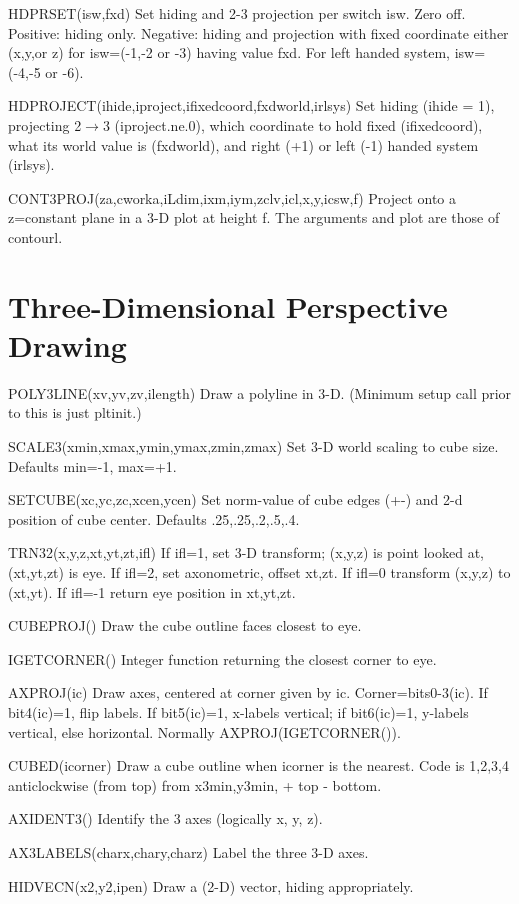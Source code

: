\documentclass[12pt]{article}
\begin{document}
HDPRSET(isw,fxd) Set hiding and 2-3 projection per switch isw. Zero
off.  Positive: hiding only. Negative: hiding and projection with
fixed coordinate either (x,y,or z) for isw=(-1,-2 or -3) having value
fxd. For left handed system, isw=(-4,-5 or -6).

HDPROJECT(ihide,iproject,ifixedcoord,fxdworld,irlsys)
Set hiding (ihide = 1), projecting 2$\rightarrow$3 (iproject.ne.0), which
coordinate to hold fixed (ifixedcoord), what its world value is
(fxdworld), and right (+1) or left (-1) handed system (irlsys).

CONT3PROJ(za,cworka,iLdim,ixm,iym,zclv,icl,x,y,icsw,f) Project onto 
a z=constant plane in a 3-D plot at height f. The arguments and plot
are those of contourl.

\section{Three-Dimensional Perspective Drawing}

POLY3LINE(xv,yv,zv,ilength) Draw a polyline in 3-D. (Minimum setup
call prior to this is just pltinit.)

SCALE3(xmin,xmax,ymin,ymax,zmin,zmax) Set 3-D world scaling to cube
size. Defaults min=-1, max=+1.

SETCUBE(xc,yc,zc,xcen,ycen) Set norm-value of cube edges (+-) and 2-d 
position of cube center. Defaults .25,.25,.2,.5,.4.

TRN32(x,y,z,xt,yt,zt,ifl) If ifl=1, set 3-D transform; (x,y,z) is
point looked at, (xt,yt,zt) is eye. If ifl=2, set axonometric, offset
xt,zt.  If ifl=0 transform (x,y,z) to (xt,yt). If ifl=-1 return eye 
position in xt,yt,zt.

CUBEPROJ() Draw the cube outline faces closest to eye.

IGETCORNER() Integer function returning the closest corner to eye.

AXPROJ(ic) Draw axes, centered at corner given by ic.
Corner=bits0-3(ic). If bit4(ic)=1, flip labels.  If bit5(ic)=1,
x-labels vertical; if bit6(ic)=1, y-labels vertical, else horizontal.
Normally AXPROJ(IGETCORNER()).

CUBED(icorner) Draw a cube outline when icorner is the nearest.
Code is 1,2,3,4 anticlockwise (from top) from x3min,y3min, + top - bottom.

AXIDENT3() Identify the 3 axes (logically x, y, z).

AX3LABELS(charx,chary,charz) Label the three 3-D axes.

HIDVECN(x2,y2,ipen) Draw a (2-D) vector, hiding appropriately.
\end{document}
